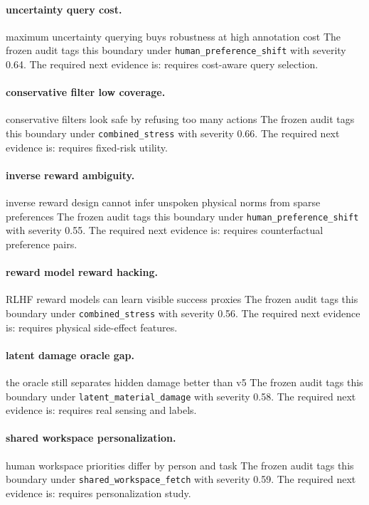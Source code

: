 \documentclass{article}
\begin{document}
\paragraph{uncertainty query cost.} maximum uncertainty querying buys robustness at high annotation cost The frozen audit tags this boundary under \texttt{human\_preference\_shift} with severity 0.64. The required next evidence is: requires cost-aware query selection.

\paragraph{conservative filter low coverage.} conservative filters look safe by refusing too many actions The frozen audit tags this boundary under \texttt{combined\_stress} with severity 0.66. The required next evidence is: requires fixed-risk utility.

\paragraph{inverse reward ambiguity.} inverse reward design cannot infer unspoken physical norms from sparse preferences The frozen audit tags this boundary under \texttt{human\_preference\_shift} with severity 0.55. The required next evidence is: requires counterfactual preference pairs.

\paragraph{reward model reward hacking.} RLHF reward models can learn visible success proxies The frozen audit tags this boundary under \texttt{combined\_stress} with severity 0.56. The required next evidence is: requires physical side-effect features.

\paragraph{latent damage oracle gap.} the oracle still separates hidden damage better than v5 The frozen audit tags this boundary under \texttt{latent\_material\_damage} with severity 0.58. The required next evidence is: requires real sensing and labels.

\paragraph{shared workspace personalization.} human workspace priorities differ by person and task The frozen audit tags this boundary under \texttt{shared\_workspace\_fetch} with severity 0.59. The required next evidence is: requires personalization study.
\end{document}
